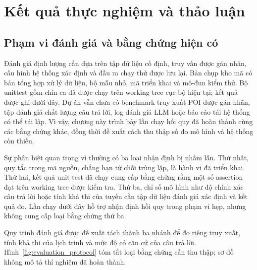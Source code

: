 \chapter{Kết quả thực nghiệm và thảo luận}
\label{chap:results_discussion}

\section{Phạm vi đánh giá và bằng chứng hiện có}

Đánh giá định lượng cần dựa trên tập dữ liệu cố định, truy vấn được gán nhãn, cấu hình hệ thống xác định và đầu ra chạy thử được lưu lại. Bản chụp kho mã có bản tổng hợp xử lý dữ liệu, bộ mẫu nhỏ, mã triển khai và mô-đun kiểm thử. Bộ unittest gồm chín ca đã được chạy trên working tree cục bộ hiện tại; kết quả được ghi dưới đây. Dự án vẫn chưa có benchmark truy xuất POI được gán nhãn, tập đánh giá chất lượng câu trả lời, log đánh giá LLM hoặc báo cáo tải hệ thống có thể tái lập. Vì vậy, chương này trình bày lần chạy hồi quy đã hoàn thành cùng các bằng chứng khác, đồng thời đề xuất cách thu thập số đo mô hình và hệ thống còn thiếu.

Sự phân biệt quan trọng vì thường có ba loại nhận định bị nhầm lẫn. Thứ nhất, quy tắc trong mã nguồn, chẳng hạn từ chối  trùng lặp, là hành vi đã triển khai. Thứ hai, kết quả unit test đã chạy cung cấp bằng chứng rằng một số assertion đạt trên working tree được kiểm tra. Thứ ba, chỉ số mô hình như độ chính xác câu trả lời hoặc tính khả thi của tuyến cần tập dữ liệu đánh giá xác định và kết quả đo. Lần chạy dưới đây hỗ trợ nhận định hồi quy trong phạm vi hẹp, nhưng không cung cấp loại bằng chứng thứ ba.

Quy trình đánh giá được đề xuất tách thành ba nhánh để đo riêng truy xuất, tính khả thi của lịch trình và mức độ có căn cứ của câu trả lời. Hình~\ref{fig:evaluation_protocol} tóm tắt loại bằng chứng cần thu thập; sơ đồ không mô tả thí nghiệm đã hoàn thành.

